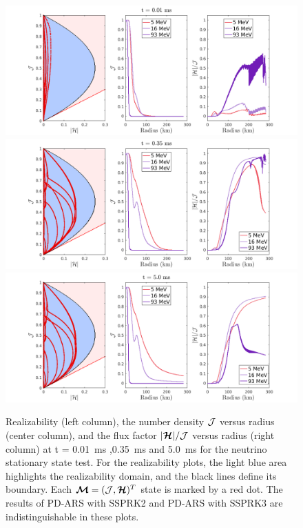 \begin{figure}[h]
  \centering
    \includegraphics[width=\textwidth]{figures/NSS_1_1}\\
    \includegraphics[width=\textwidth]{figures/NSS_3_1} \\
    \includegraphics[width=\textwidth]{figures/NSS_5_1} \\
    \caption{Realizability (left column), the number density $\mathcal{J}$ versus radius (center column), and the flux factor $|\boldsymbol{\mathcal{H}}|/\mathcal{J}$ versus radius (right column) at t = 0.01~ms ,0.35~ms and 5.0~ms for the neutrino stationary state test. For the realizability plots, the light blue area highlights the realizability domain, and the black lines define its boundary. Each $\boldsymbol{\mathcal{M}}=(\mathcal{J},\boldsymbol{\mathcal{H}})^{T}$ state is marked by a red dot. The results of PD-ARS with SSPRK2 and PD-ARS with SSPRK3 are indistinguishable in these plots.}
    \label{fig:NeutrinoStationaryTestEvolve}
\end{figure}

\clearpage